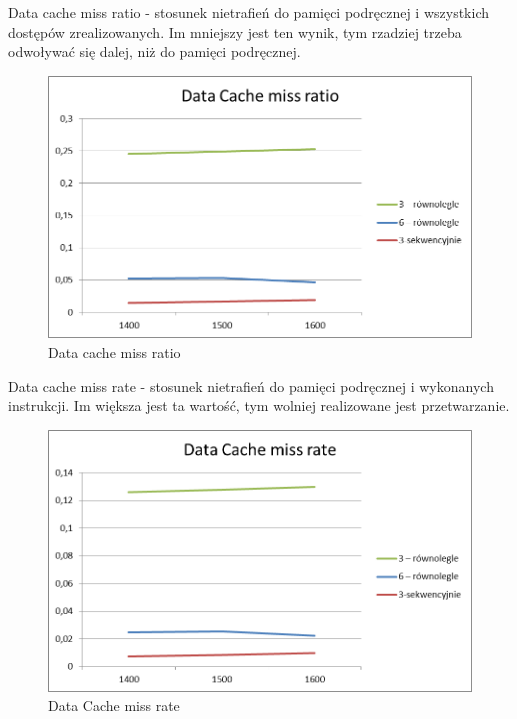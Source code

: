 \documentclass{article}
\begin{document}
Data cache miss ratio - stosunek nietrafień do pamięci podręcznej i wszystkich dostępów zrealizowanych. Im mniejszy jest ten wynik, tym rzadziej trzeba odwoływać się dalej, niż do pamięci podręcznej. 

\begin{figure}[H]
	\centering
	\includegraphics[bb=0 0 1280 960]{./images/wykresy/Data Cache miss ratio.png}
	\caption{Data cache miss ratio}
	\label{fig:3medium}
\end{figure}

Data cache miss rate - stosunek nietrafień do pamięci podręcznej i wykonanych instrukcji. Im większa jest ta wartość, tym wolniej realizowane jest przetwarzanie.  

\begin{figure}[H]
	\centering
	\includegraphics[bb=0 0 1280 960]{./images/wykresy/Data Cache miss rate.png}
	\caption{Data Cache miss rate}
	\label{fig:3medium}
\end{figure}
\end{document}
